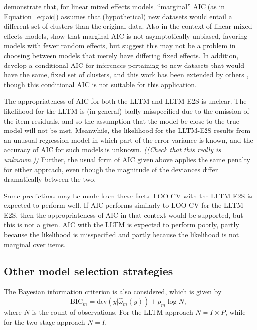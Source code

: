 \textcite{Vaida2005} demonstrate that, for linear mixed effects models, ``marginal'' AIC (as in Equation~\ref{eq:aic}) assumes that (hypothetical) new datasets would entail a different set of clusters than the original data. Also in the context of linear mixed effects models, \textcite{Greven2010} show that marginal AIC is not asymptotically unbiased, favoring models with fewer random effects, but suggest this may not be a problem in choosing between models that merely have differing fixed effects. In addition, \textcite{Vaida2005} develop a conditional AIC for inferences pertaining to new datasets that would have the same, fixed set of clusters, and this work has been extended by others \parencite{Liang2008, Greven2010, yu2012conditional, yu2013information, saefken2014unifying}, though this conditional AIC is not suitable for this application.

The appropriateness of AIC for both the LLTM and LLTM-E2S is unclear. The likelihood for the LLTM is (in general) badly misspecified due to the omission of the item residuals, and so the assumption that the model be close to the true model will not be met. Meanwhile, the likelihood for the LLTM-E2S results from an unusual regression model in which part of the error variance is known, and the accuracy of AIC for such models is unknown. \emph{((Check that this really is unknown.))} Further, the usual form of AIC given above applies the same penalty for either approach, even though the magnitude of the deviances differ dramatically between the two.

Some predictions may be made from these facts. LOO-CV with the LLTM-E2S is expected to perform well. If AIC performs similarly to LOO-CV for the LLTM-E2S, then the appropriateness of AIC in that context would be supported, but this is not a given. AIC with the LLTM is expected to perform poorly, partly because the likelihood is misspecified and partly because the likelihood is not marginal over items.


\subsection{Other model selection strategies}

The Bayesian information criterion \parencite[BIC;][]{schwarz1978estimating} is also considered, which is given by
\begin{equation}
	\mathrm{BIC}_m = \mathrm{dev}(y | \hat \omega_m(y)) + p_m \log N
,\end{equation}
where $N$ is the count of observations. For the LLTM approach $N = I \times P$, while for the two stage approach $N = I$.

